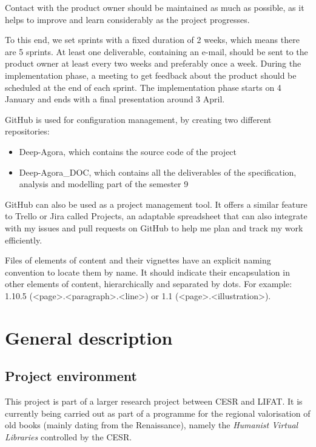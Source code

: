 \documentclass{polytech/polytech}
\numberwithin{figure}{chapter}
\begin{document}
Contact with the product owner should be maintained as much as possible, as it helps to improve and learn considerably as the project progresses.

To this end, we set sprints with a fixed duration of 2 weeks, which means there are 5 sprints.
At least one deliverable, containing an e-mail, should be sent to the product owner at least every two weeks and preferably once a week.
During the implementation phase, a meeting to get feedback about the product should be scheduled at the end of each sprint.
The implementation phase starts on 4 January and ends with a final presentation around 3 April.

GitHub is used for configuration management, by creating two different repositories:
\begin{itemize}
\item Deep-Agora, which contains the source code of the project
\item Deep-Agora_DOC, which contains all the deliverables of the specification, analysis and modelling part of the semester 9
\end{itemize}

GitHub can also be used as a project management tool.
It offers a similar feature to Trello or Jira called Projects, an adaptable spreadsheet that can also integrate with my issues and pull requests on GitHub to help me plan and track my work efficiently.

Files of elements of content and their vignettes have an explicit naming convention to locate them by name.
It should indicate their encapsulation in other elements of content, hierarchically and separated by dots.
For example: 1.10.5 (<page>.<paragraph>.<line>) or 1.1 (<page>.<illustration>).



\chapter{General description}


\section{Project environment}

This project is part of a larger research project between CESR and LIFAT.
It is currently being carried out as part of a programme for the regional valorisation of old books (mainly dating from the Renaissance), namely the {\it Humanist Virtual Libraries} controlled by the CESR.
\end{document}
